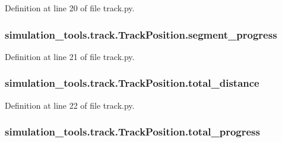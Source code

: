 Definition at line 20 of file track.\+py.

\subsubsection[{\texorpdfstring{segment\+\_\+progress}{segment_progress}}]{\setlength{\rightskip}{0pt plus 5cm}simulation\+\_\+tools.\+track.\+Track\+Position.\+segment\+\_\+progress}\hypertarget{classsimulation__tools_1_1track_1_1_track_position_a1ce2f49333cc2e6d5ac1094a3e919eeb}{}\label{classsimulation__tools_1_1track_1_1_track_position_a1ce2f49333cc2e6d5ac1094a3e919eeb}


Definition at line 21 of file track.\+py.

\subsubsection[{\texorpdfstring{total\+\_\+distance}{total_distance}}]{\setlength{\rightskip}{0pt plus 5cm}simulation\+\_\+tools.\+track.\+Track\+Position.\+total\+\_\+distance}\hypertarget{classsimulation__tools_1_1track_1_1_track_position_a488a7374a672827079686cf7fece12ee}{}\label{classsimulation__tools_1_1track_1_1_track_position_a488a7374a672827079686cf7fece12ee}


Definition at line 22 of file track.\+py.

\subsubsection[{\texorpdfstring{total\+\_\+progress}{total_progress}}]{\setlength{\rightskip}{0pt plus 5cm}simulation\+\_\+tools.\+track.\+Track\+Position.\+total\+\_\+progress}\hypertarget{classsimulation__tools_1_1track_1_1_track_position_a0471b3519ccab2dfd048ed02853f8a8d}{}\label{classsimulation__tools_1_1track_1_1_track_position_a0471b3519ccab2dfd048ed02853f8a8d}



